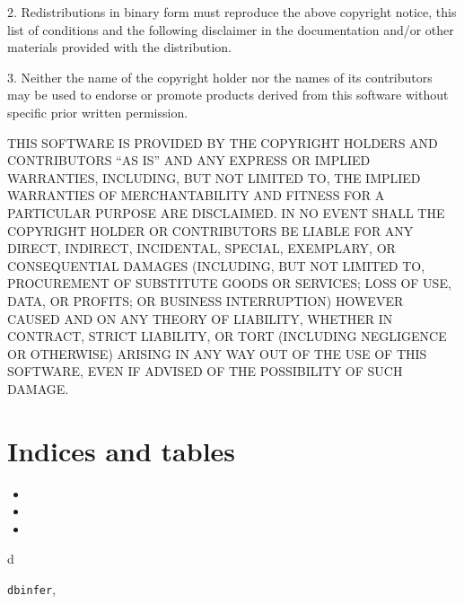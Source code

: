 \documentclass[a4paper,11pt,english]{sphinxmanual}
\begin{document}
2. Redistributions in binary form must reproduce the above copyright notice, this
list of conditions and the following disclaimer in the documentation and/or other
materials provided with the distribution.

3. Neither the name of the copyright holder nor the names of its contributors may
be used to endorse or promote products derived from this software without specific
prior written permission.

THIS SOFTWARE IS PROVIDED BY THE COPYRIGHT HOLDERS AND CONTRIBUTORS ``AS IS'' AND ANY
EXPRESS OR IMPLIED WARRANTIES, INCLUDING, BUT NOT LIMITED TO, THE IMPLIED WARRANTIES
OF MERCHANTABILITY AND FITNESS FOR A PARTICULAR PURPOSE ARE DISCLAIMED. IN NO EVENT
SHALL THE COPYRIGHT HOLDER OR CONTRIBUTORS BE LIABLE FOR ANY DIRECT, INDIRECT,
INCIDENTAL, SPECIAL, EXEMPLARY, OR CONSEQUENTIAL DAMAGES (INCLUDING, BUT NOT LIMITED
TO, PROCUREMENT OF SUBSTITUTE GOODS OR SERVICES; LOSS OF USE, DATA, OR PROFITS; OR
BUSINESS INTERRUPTION) HOWEVER CAUSED AND ON ANY THEORY OF LIABILITY, WHETHER IN
CONTRACT, STRICT LIABILITY, OR TORT (INCLUDING NEGLIGENCE OR OTHERWISE) ARISING IN
ANY WAY OUT OF THE USE OF THIS SOFTWARE, EVEN IF ADVISED OF THE POSSIBILITY OF SUCH
DAMAGE.


\chapter{Indices and tables}
\label{index:indices-and-tables}\begin{itemize}
\item {} 

\item {} 

\item {} 

\end{itemize}


\renewcommand{\indexname}{Python Module Index}
\begin{theindex}
\def\bigletter#1{{\Large\sffamily#1}\nopagebreak\vspace{1mm}}
\bigletter{d}
\item {\texttt{dbinfer}}, \pageref{reference:module-dbinfer}
\end{theindex}

\renewcommand{\indexname}{Index}
\printindex
\end{document}
